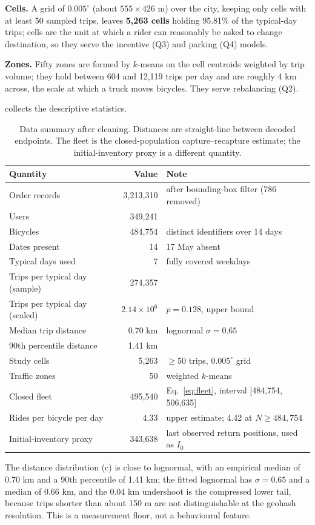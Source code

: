 \textbf{Cells.} A grid of $0.005^\circ$ (about $555\times426$ m) over the city,
keeping only cells with at least 50 sampled trips, leaves \textbf{5,263 cells}
holding 95.81\% of the typical-day trips; cells are the unit at which a rider can
reasonably be asked to change destination, so they serve the incentive (Q3) and
parking (Q4) models.

\textbf{Zones.} Fifty zones are formed by $k$-means on the cell centroids weighted by
trip volume; they hold between 604 and 12,119 trips per day and are roughly 4 km
across, the scale at which a truck moves bicycles. They serve rebalancing (Q2).

 collects the descriptive statistics.

\begin{table}[htbp]
\centering
\footnotesize
\caption[Data summary after cleaning]{Data summary after cleaning. Distances are straight-line between decoded
endpoints. The fleet is the closed-population capture--recapture estimate; the
initial-inventory proxy is a different quantity.}
\label{tab:data}
\scriptsize
\begin{tabular}{@{}lrl@{}}
\toprule
\textbf{Quantity} & \textbf{Value} & \textbf{Note} \\
\midrule
Order records & 3,213,310 & after bounding-box filter (786 removed) \\
Users & 349,241 & \\
Bicycles & 484,754 & distinct identifiers over 14 days \\
Dates present & 14 & 17 May absent \\
Typical days used & 7 & fully covered weekdays \\
Trips per typical day (sample) & 274,357 & \\
Trips per typical day (scaled) & $2.14\times10^6$ & $p=0.128$, upper bound \\
Median trip distance & 0.70 km & lognormal $\sigma=0.65$ \\
90th percentile distance & 1.41 km & \\
Study cells & 5,263 & $\geq50$ trips, $0.005^\circ$ grid \\
Traffic zones & 50 & weighted $k$-means \\
Closed fleet & 495,540 & Eq.~\eqref{eq:fleet}, interval [484,754, 506,635] \\
Rides per bicycle per day & 4.33 & upper estimate; 4.42 at $N\ge484{,}754$ \\
Initial-inventory proxy & 343,638 & last observed return positions, used as $I_0$ \\
\bottomrule
\end{tabular}
\end{table}

The distance distribution (c) is close to lognormal, with an
empirical median of 0.70 km and a 90th percentile of 1.41 km; the fitted lognormal has
$\sigma=0.65$ and a median of 0.66 km, and the 0.04 km undershoot is the compressed
lower tail, because trips shorter than about 150 m are not distinguishable at the
geohash resolution. This is a measurement floor, not a behavioural feature.
